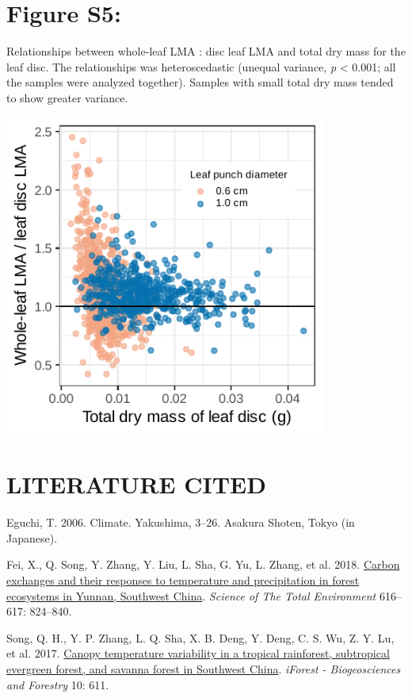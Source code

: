 \documentclass[
  12pt,
]{article}
\newlength{\cslhangindent}
\newlength{\cslentryspacingunit} %
\newenvironment{CSLReferences}[2] %
 {%
  \setlength{\parindent}{0pt}
  \ifodd #1
  \let\oldpar\par
  \def\par{\hangindent=\cslhangindent\oldpar}
  \fi
  \setlength{\parskip}{#2\cslentryspacingunit}
 }%
 {}
\begin{document}
\newpage

\hypertarget{figure-s5}{%
\section{Figure S5:}\label{figure-s5}}

Relationships between whole-leaf LMA : disc leaf LMA and total dry mass for the leaf disc.
The relationships was heteroscedastic (unequal variance, \emph{p} \textless{} 0.001; all the samples were analyzed together).
Samples with small total dry mass tended to show greater variance.

\includegraphics[width=4.16667in,height=\textheight]{../figs/ratio_dm.pdf}

\newpage

\hypertarget{literature-cited}{%
\section*{LITERATURE CITED}\label{literature-cited}}

\hypertarget{refs}{}
\begin{CSLReferences}{1}{0}
\leavevmode{}%
Eguchi, T. 2006. Climate. Yakushima, 3--26. {Asakura Shoten}, {Tokyo (in Japanese)}.

\leavevmode{}%
Fei, X., Q. Song, Y. Zhang, Y. Liu, L. Sha, G. Yu, L. Zhang, et al. 2018. \href{https://doi.org/10.1016/j.scitotenv.2017.10.239}{Carbon exchanges and their responses to temperature and precipitation in forest ecosystems in {Yunnan}, {Southwest China}}. \emph{Science of The Total Environment} 616--617: 824--840.

\leavevmode{}%
Song, Q. H., Y. P. Zhang, L. Q. Sha, X. B. Deng, Y. Deng, C. S. Wu, Z. Y. Lu, et al. 2017. \href{https://doi.org/10.3832/ifor2223-010}{Canopy temperature variability in a tropical rainforest, subtropical evergreen forest, and savanna forest in {Southwest China}}. \emph{iForest - Biogeosciences and Forestry} 10: 611.

\end{CSLReferences}
\end{document}
